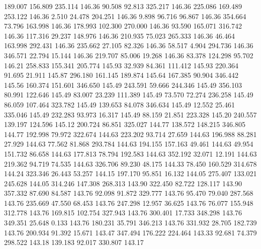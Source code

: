  189.007  156.809  235.114       146.36
  90.508   92.813  325.217       146.36
 225.086  169.489  253.122       146.36
   2.510   24.478  204.251       146.36
   9.898   96.716   96.867       146.36
 354.664   73.796  163.998       146.36
 178.993  102.300  270.000       146.36
  93.590  165.071  316.742       146.36
 117.316   29.237  148.976       146.36
 210.935   75.023  265.333       146.36
  46.464  163.998  292.431       146.36
 235.662   27.105   82.326       146.36
  58.517    4.904  294.736       146.36
 346.571   22.794   15.144       146.36
 219.707   85.006   19.268       146.36
  83.378  124.298   95.702       146.21
 258.833  155.341  205.774       145.93
  32.939   84.361  111.412       145.93
 220.364   91.695   21.911       145.87
 296.180  161.145  189.874       145.64
 167.385   90.904  346.442       145.56
 160.374  151.601  346.650       145.49
 243.591   59.666  244.346       145.49
 356.103   80.991  122.646       145.49
  83.007   23.239  111.389       145.49
  73.570   72.274  236.258       145.49
  86.059  107.464  323.782       145.49
 139.653   84.078  346.634       145.49
  12.552   25.461  335.046       145.49
 232.283   93.973   16.317       145.49
  88.159   21.851  223.328       145.20
 240.557  139.197  124.596       145.12
 200.724   86.851  325.027       144.77
 138.572  148.215  346.805       144.77
 192.998   79.972  322.674       144.63
 223.202   93.714   27.659       144.63
 196.988   88.281   27.929       144.63
  77.562   81.868  293.784       144.63
 194.155  157.163   49.461       144.63
  49.954  151.732   86.658       144.63
 177.813   78.794  192.583       144.63
 352.192   32.071   12.191       144.63
 219.362   94.719   74.535       144.63
 326.706   89.230   48.175       144.33
  78.450  160.529  314.678       144.24
 323.346   26.443   53.257       144.15
 197.170   95.851   16.132       144.05
 275.407  133.021  245.628       144.05
 314.246  147.308  268.313       143.90
 322.450   82.722  128.117       143.90
 357.332   87.690   84.587       143.76
  92.098   91.872  329.777       143.76
  95.470   79.040  287.568       143.76
 235.669   47.550   68.453       143.76
 247.298   12.957   36.625       143.76
  76.077  155.948  312.778       143.76
 169.815  102.754  327.943       143.76
 300.401   17.733  348.298       143.76
 349.351   25.648    0.133       143.76
 180.231   35.791  346.213       143.76
 331.932   28.705  182.739       143.76
 200.934   91.392   15.671       143.47
 347.494  176.222  224.464       143.33
  92.681   74.379  298.522       143.18
 139.183   92.017  330.807       143.17
